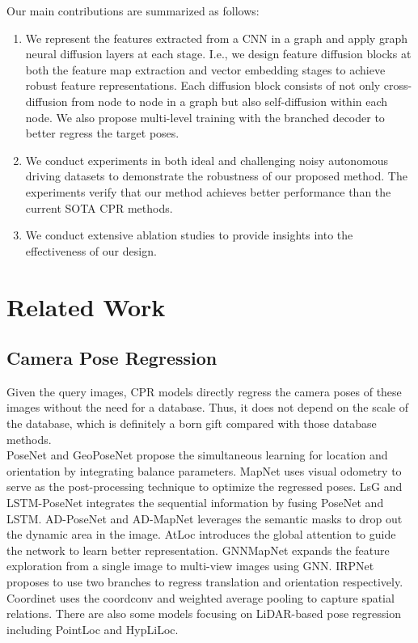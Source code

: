 \documentclass[letterpaper]{article} \usepackage{aaai23}  \usepackage{times}  \usepackage{helvet}  \usepackage{courier}  \usepackage[hyphens]{url}  \usepackage{graphicx} \urlstyle{rm} \def\UrlFont{\rm}  \usepackage{natbib}  \usepackage{caption} \frenchspacing  \setlength{\pdfpagewidth}{8.5in} \setlength{\pdfpageheight}{11in} \usepackage{booktabs}
\theoremstyle{remark}
\theoremstyle{plain}
\begin{document}
Our main contributions are summarized as follows:
\begin{enumerate}

\item 
We represent the features extracted from a CNN in a graph and apply graph neural diffusion layers at each stage. I.e., we design feature diffusion blocks at both the feature map extraction and vector embedding stages to achieve robust feature representations. Each diffusion block consists of not only cross-diffusion from node to node in a graph but also self-diffusion within each node. We also propose multi-level training with the branched decoder to better regress the target poses.



\item We conduct experiments in both ideal and challenging noisy autonomous driving datasets to demonstrate the robustness of our proposed method. The experiments verify that our method achieves better performance than the current SOTA CPR methods. 

\item We conduct extensive ablation studies to provide insights into the effectiveness of our design. 
\end{enumerate}




\section{Related Work}








\subsection{Camera Pose Regression}
Given the query images, CPR models directly regress the camera poses of these images without the need for a database. Thus, it does not depend on the scale of the database, which is definitely a born gift compared with those database methods.  \\
PoseNet \cite{posenet} and GeoPoseNet \cite{geoposenet2017} propose the simultaneous learning for location and orientation by integrating balance parameters. MapNet \cite{mapnet} uses visual odometry to serve as the post-processing technique to optimize the regressed poses. LsG \cite{lsg} and LSTM-PoseNet \cite{lstmpose} integrates the sequential information by fusing PoseNet and LSTM. AD-PoseNet and AD-MapNet \cite{adposenet} leverages the semantic masks to drop out the dynamic area in the image. AtLoc \cite{atloc} introduces the global attention to guide the network to learn better representation. GNNMapNet \cite{gnnmapnet} expands the feature exploration from a single image to multi-view images using GNN. IRPNet \cite{irpnet} proposes to use two branches to regress translation and orientation respectively. Coordinet \cite{coordinet} uses the coordconv \cite{coordconv} and weighted average pooling \cite{fc4} to capture spatial relations. There are also some models focusing on LiDAR-based pose regression including PointLoc\cite{wang2021pointloc} and HypLiLoc\cite{wang2023hypliloc}. 
\end{document}
